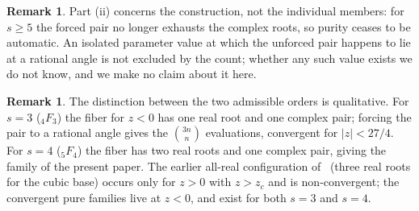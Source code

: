 \documentclass[11pt]{article}
\theoremstyle{definition}
\newtheorem{remark}[theorem]{Remark}
\begin{document}
\begin{remark}
Part (ii) concerns the construction, not the individual members: for $s\ge5$ the forced pair no
longer exhausts the complex roots, so purity ceases to be automatic. An isolated parameter value at
which the unforced pair happens to lie at a rational angle is not excluded by the count; whether any
such value exists we do not know, and we make no claim about it here.
\end{remark}

\begin{remark}
The distinction between the two admissible orders is qualitative. For $s=3$ (${}_4F_3$) the fiber for
$z<0$ has one real root and one complex pair; forcing the pair to a rational angle gives the
$\binom{3n}{n}$ evaluations, convergent for $|z|<27/4$. For $s=4$ (${}_5F_4$) the fiber has two real
roots and one complex pair, giving the family of the present paper. The earlier all-real
configuration of~\cite{DaurizioDiTrani} (three real roots for the cubic base) occurs only for $z>0$
with $z>z_c$ and is non-convergent; the convergent pure families live at $z<0$, and exist for both
$s=3$ and $s=4$.
\end{remark}
\end{document}
